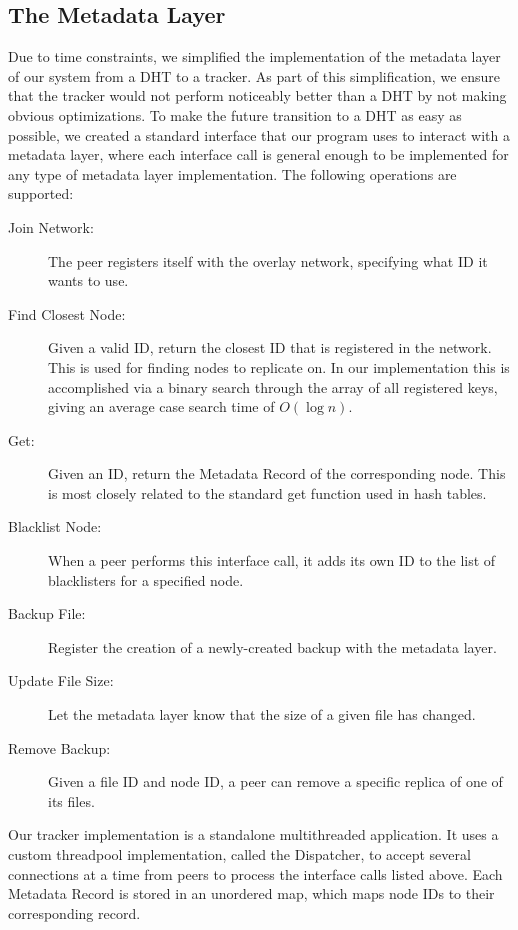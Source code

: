 \documentclass[12pt]{report}
\begin{document}
\subsection{The Metadata Layer} \label{subsec:TheMetadataLayer_sec:SystemDesign}
Due to time constraints, we simplified the implementation of the metadata layer of our system from a DHT to a tracker. As part of this simplification, we ensure that the tracker would not perform noticeably better than a DHT by not making obvious optimizations. To make the future transition to a DHT as easy as possible, we created a standard interface that our program uses to interact with a metadata layer, where each interface call is general enough to be implemented for any type of metadata layer implementation. The following operations are supported:
\begin{description}
\item[Join Network:] The peer registers itself with the overlay network, specifying what ID it wants to use.
\item[Find Closest Node:] Given a valid ID, return the closest ID that is registered in the network. This is used for finding nodes to replicate on. In our implementation this is accomplished via a binary search through the array of all registered keys, giving an average case search time of $O(\log n)$.
\item[Get:] Given an ID, return the Metadata Record of the corresponding node. This is most closely related to the standard get function used in hash tables.
\item[Blacklist Node:] When a peer performs this interface call, it adds its own ID to the list of blacklisters for a specified node.
\item[Backup File:] Register the creation of a newly-created backup with the metadata layer.
\item[Update File Size:] Let the metadata layer know that the size of a given file has changed.
\item[Remove Backup:] Given a file ID and node ID, a peer can remove a specific replica of one of its files.
\end{description}
Our tracker implementation is a standalone multithreaded application. It uses a custom threadpool implementation, called the Dispatcher, to accept several connections at a time from peers to process the interface calls listed above. Each Metadata Record is stored in an unordered map, which maps node IDs to their corresponding record.
\end{document}
